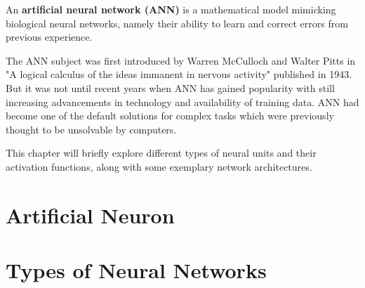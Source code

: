 An \textbf{artificial neural network (ANN)} is a mathematical model mimicking biological neural networks,
namely their ability to learn and correct errors from previous experience.\cite{designimplentationcc}\cite{bengio2017deep} 

The ANN subject was first introduced by Warren McCulloch and Walter Pitts in "A logical calculus of the ideas immanent in nervous activity" published in 1943.\cite{mcculloch1943logical} But it was not until recent years when ANN has gained popularity with still increasing advancements in technology and availability of training data. ANN had become one of the default solutions for complex tasks which were previously thought to be unsolvable by computers.\cite{neural2016krishtopa}

This chapter will briefly explore different types of neural units and their activation functions, along with some exemplary network architectures.

\section{Artificial Neuron}

\section{Types of Neural Networks}

